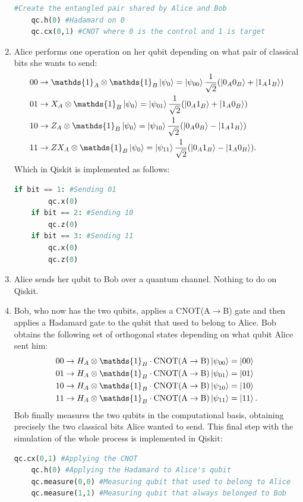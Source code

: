\documentclass[12pt]{article}
\newcommand*\id{\mathds{1}}
\begin{document}
\begin{appendices}
\begin{enumerate}
\begin{lstlisting}[language=Python]
    #Create the entangled pair shared by Alice and Bob
    qc.h(0) #Hadamard on 0
    qc.cx(0,1) #CNOT where 0 is the control and 1 is target
    \end{lstlisting}
    \item Alice performs one operation on her qubit depending on what pair of classical bits she wants to send:
    \begin{align}
   & 00 \rightarrow \id_A \otimes \id_B \ket{\psi_0} = \ket{\psi_{00}} \frac{1}{\sqrt{2}}(\ket{0_A0_B} + \ket{1_A1_B}) \\
    & 01 \rightarrow X_A \otimes \id_B \ket{\psi_0} = \ket{\psi_{01}} \frac{1}{\sqrt{2}}(\ket{0_A1_B} + \ket{1_A0_B})\\
    & 10 \rightarrow Z_A \otimes \id_B \ket{\psi_0} = \ket{\psi_{10}} \frac{1}{\sqrt{2}}(\ket{0_A0_B} - \ket{1_A1_B})\\
    & 11 \rightarrow ZX_A \otimes \id_B \ket{\psi_0} = \ket{\psi_{11}} \frac{1}{\sqrt{2}}(\ket{0_A1_B} - \ket{1_A0_B}).
    \end{align}
    Which in Qiskit is implemented as follows:
    \begin{lstlisting}[language=Python]
    if bit == 1: #Sending 01
        qc.x(0)
    if bit == 2: #Sending 10
        qc.z(0)
    if bit == 3: #Sending 11
        qc.x(0)
        qc.z(0)
    \end{lstlisting}
    \item Alice sends her qubit to Bob over a quantum channel. Nothing to do on Qiskit.
    \item Bob, who now has the two qubits, applies a CNOT(A$\rightarrow$B) gate and then applies a Hadamard gate to the qubit that used to belong to Alice. Bob obtains the following set of orthogonal states depending on what qubit Alice sent him:
    \begin{align}
   & 00 \rightarrow  H_A \otimes \id_B  \cdot \textrm{CNOT(A} \rightarrow \textrm{B)} \ket{\psi_{00}} =  \ket{00}\\
    & 01 \rightarrow H_A \otimes \id_B  \cdot \textrm{CNOT(A} \rightarrow \textrm{B)} \ket{\psi_{01}} =  \ket{01}\\
    & 10 \rightarrow H_A \otimes \id_B  \cdot \textrm{CNOT(A} \rightarrow \textrm{B)} \ket{\psi_{10}} =  \ket{10}\\
    & 11 \rightarrow H_A \otimes \id_B  \cdot \textrm{CNOT(A} \rightarrow \textrm{B)} \ket{\psi_{11}} =  \ket{11}.\\
    \end{align}
    Bob finally measures the two qubits in the computational basis, obtaining precisely the two classical bits Alice wanted to send. This final step with the simulation of the whole process is implemented in Qiskit:
    \begin{lstlisting}[language=Python]
    qc.cx(0,1) #Applying the CNOT 
    qc.h(0) #Applying the Hadamard to Alice's qubit
    qc.measure(0,0) #Measuring qubit that used to belong to Alice
    qc.measure(1,1) #Measuring qubit that always belonged to Bob
    

\end{lstlisting}
\end{enumerate}
\end{appendices}
\end{document}
